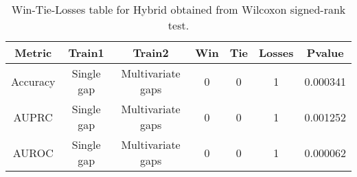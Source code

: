 \begin{table}[H]
\centering
\begin{tabular}{|c|c|c|c|c|c|c|}

\textbf{Metric} & \textbf{Train1} &    \textbf{Train2} &  \textbf{Win} &  \textbf{Tie} &  \textbf{Losses} &  \textbf{Pvalue} \\
\hline

       Accuracy &      Single gap &  Multivariate gaps &             0 &             0 &                1 &         0.000341 \\
\hline
          AUPRC &      Single gap &  Multivariate gaps &             0 &             0 &                1 &         0.001252 \\
\hline
          AUROC &      Single gap &  Multivariate gaps &             0 &             0 &                1 &         0.000062 \\
\hline

\end{tabular}
\caption{Win-Tie-Losses table for Hybrid obtained from Wilcoxon signed-rank test.}
\label{tab:hybrid_training_data_comparison}
\end{table}